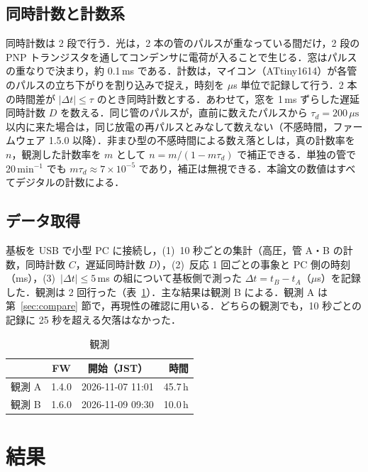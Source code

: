 \documentclass[a4paper,twocolumn,10pt]{ltjsarticle}
\newcommand{\us}{\,\mu\mathrm{s}}
\begin{document}
\subsection{同時計数と計数系}

同時計数は 2 段で行う．光は，2 本の管のパルスが重なっている間だけ，2 段の PNP トランジスタを通してコンデンサに電荷が入ることで生じる．窓はパルスの重なりで決まり，約 0.1\,ms である．計数は，マイコン（ATtiny1614）が各管のパルスの立ち下がりを割り込みで捉え，時刻を $\mu$s 単位で記録して行う．2 本の時間差が $|\Delta t| \le \tau$ のとき同時計数とする．あわせて，窓を 1\,ms ずらした遅延同時計数 $D$ を数える．同じ管のパルスが，直前に数えたパルスから $\tau_d = 200\us$ 以内に来た場合は，同じ放電の再パルスとみなして数えない（不感時間，ファームウェア 1.5.0 以降）．非まひ型の不感時間による数え落としは，真の計数率を $n$，観測した計数率を $m$ として $n = m/(1 - m\tau_d)$ で補正できる\cite{knoll}．単独の管で 20\,min$^{-1}$ でも $m\tau_d \approx 7\times10^{-5}$ であり，補正は無視できる．本論文の数値はすべてデジタルの計数による．

\subsection{データ取得}

基板を USB で小型 PC に接続し，(1)~10 秒ごとの集計（高圧，管 A・B の計数，同時計数 $C$，遅延同時計数 $D$），(2)~反応 1 回ごとの事象と PC 側の時刻（ms），(3)~$|\Delta t| \le 5$\,ms の組について基板側で測った $\Delta t = t_B - t_A$（$\mu$s）を記録した．観測は 2 回行った（表~\ref{tab:runs}）．主な結果は観測 B による．観測 A は第~\ref{sec:compare} 節で，再現性の確認に用いる．どちらの観測でも，10 秒ごとの記録に 25 秒を超える欠落はなかった．

\begin{table}[t]
\centering\small
\caption{観測}
\label{tab:runs}
\begin{tabular}{@{}lccr@{}}
\toprule
 & FW & 開始（JST） & 時間 \\
\midrule
観測 A & 1.4.0 & 2026-11-07 11:01 & 45.7\,h \\
観測 B & 1.6.0 & 2026-11-09 09:30 & 10.0\,h \\
\bottomrule
\end{tabular}
\end{table}

\section{結果}
\end{document}
